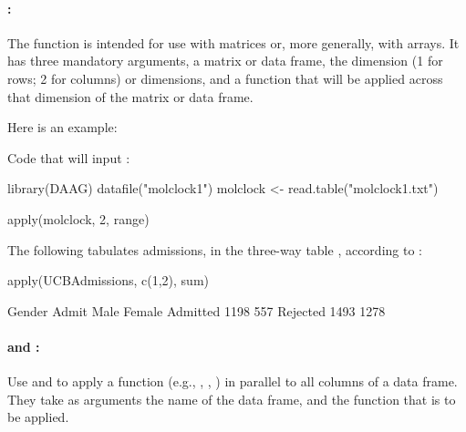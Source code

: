 \paragraph{:}
The function  is intended for use with matrices or, more
generally, with arrays.
It has three mandatory arguments, a matrix or data frame, the dimension
(1 for rows; 2 for columns) or dimensions, and a function that will be
applied across that dimension of the matrix or data frame.

Here is an example:
\begin{marginfigure}[30pt]
Code that will input :
\begin{Schunk}
\begin{Sinput}
library(DAAG)
datafile("molclock1")
molclock <-
  read.table("molclock1.txt")
\end{Sinput}
\end{Schunk}
\end{marginfigure}

\begin{Schunk}
\begin{Sinput}
apply(molclock, 2, range)
\end{Sinput}
\end{Schunk}

The following tabulates admissions, in the three-way table
, according to :
\begin{Schunk}
\begin{Sinput}
apply(UCBAdmissions, c(1,2), sum)
\end{Sinput}
\begin{Soutput}
          Gender
Admit      Male Female
  Admitted 1198    557
  Rejected 1493   1278
\end{Soutput}
\end{Schunk}

\paragraph{ and :}
Use  and  to
apply a function (e.g., , , ) in
parallel to all columns of a data frame. They take as arguments the
name of the data frame, and the function that is to be applied.

